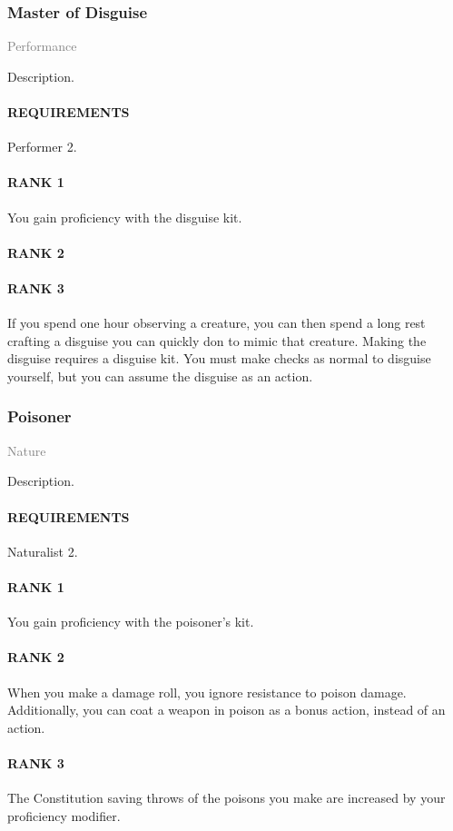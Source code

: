 \subsubsection{Master of Disguise} \label{feat::masterofdisguise}
\small{\textcolor{gray}{Performance}}

\normalsize
Description.
\paragraph{REQUIREMENTS} Performer 2.
\paragraph{RANK 1} You gain proficiency with the disguise kit.
\paragraph{RANK 2}
\paragraph{RANK 3} If you spend one hour observing a creature, you can then spend a long rest crafting a disguise you can quickly don to mimic that creature.
Making the disguise requires a disguise kit.
You must make checks as normal to disguise yourself, but you can assume the disguise as an action.

\subsubsection{Poisoner} \label{feat::poisoner}
\small{\textcolor{gray}{Nature}}

\normalsize
Description.
\paragraph{REQUIREMENTS} Naturalist 2.
\paragraph{RANK 1} You gain proficiency with the poisoner's kit.
\paragraph{RANK 2} When you make a damage roll, you ignore resistance to poison damage.
Additionally, you can coat a weapon in poison as a bonus action, instead of an action.
\paragraph{RANK 3} The Constitution saving throws of the poisons you make are increased by your proficiency modifier.

